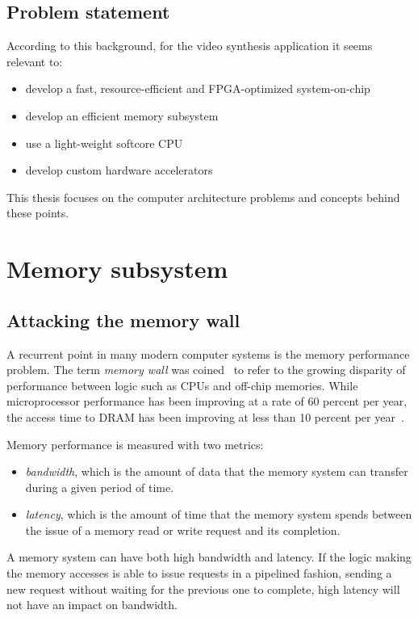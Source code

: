 \documentclass[a4paper,11pt]{kthesis}
\begin{document}
\section{Problem statement}
According to this background, for the video synthesis application it seems relevant to:

\begin{itemize}
\item develop a fast, resource-efficient and FPGA-optimized system-on-chip
\item develop an efficient memory subsystem
\item use a light-weight softcore CPU
\item develop custom hardware accelerators
\end{itemize}

This thesis focuses on the computer architecture problems and concepts behind these points.

\chapter{Memory subsystem}
\section{Attacking the memory wall}
A recurrent point in many modern computer systems is the memory performance problem. The term \textit{memory wall} was coined~\cite{memorywall} to refer to the growing disparity of performance between logic such as CPUs and off-chip memories. While microprocessor performance has been improving at a rate of 60 percent per year, the access time to DRAM has been improving at less than 10 percent per year~\cite{memvscpu}.

Memory performance is measured with two metrics:
\begin{itemize}
\item \textit{bandwidth}, which is the amount of data that the memory system can transfer during a given period of time.
\item \textit{latency}, which is the amount of time that the memory system spends between the issue of a memory read or write request and its completion.
\end{itemize}

A memory system can have both high bandwidth and latency. If the logic making the memory accesses is able to issue requests in a pipelined fashion, sending a new request without waiting for the previous one to complete, high latency will not have an impact on bandwidth.
\end{document}
